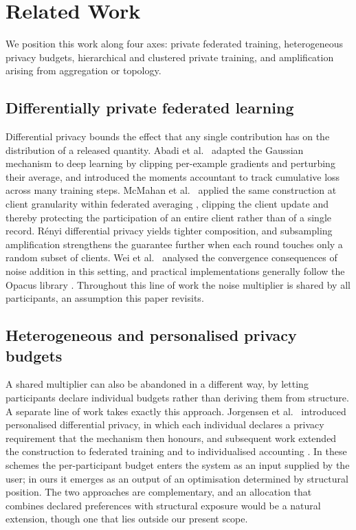 \documentclass[acmsmall,screen,review,anonymous]{acmart}
\theoremstyle{acmdefinition}%
\begin{document}
\section{Related Work}
\label{sec:related}

We position this work along four axes: private federated training, heterogeneous
privacy budgets, hierarchical and clustered private training, and amplification
arising from aggregation or topology.

\subsection{Differentially private federated learning}

Differential privacy \cite{dwork2006calibrating} bounds the effect that any single
contribution has on the distribution of a released quantity. Abadi et
al.~\cite{abadi2016dpsgd} adapted the Gaussian mechanism to deep learning by
clipping per-example gradients and perturbing their average, and introduced the
moments accountant to track cumulative loss across many training steps. McMahan et
al.~\cite{mcmahan2018dprnn} applied the same construction at client granularity
within federated averaging \cite{mcmahan2017fedavg}, clipping the client update and
thereby protecting the participation of an entire client rather than of a single
record. R\'enyi differential privacy \cite{mironov2017rdp} yields tighter
composition, and subsampling amplification \cite{wang2019subsampled} strengthens
the guarantee further when each round touches only a random subset of clients. Wei
et al.~\cite{wei2020nbafl} analysed the convergence consequences of noise addition
in this setting, and practical implementations generally follow the Opacus library
\cite{yousefpour2021opacus}. Throughout this line of work the noise multiplier is
shared by all participants, an assumption this paper revisits.

\subsection{Heterogeneous and personalised privacy budgets}

A shared multiplier can also be abandoned in a different way, by letting
participants declare individual budgets rather than deriving them from structure. A
separate line of work takes exactly this approach. Jorgensen et
al.~\cite{jorgensen2015personalized} introduced personalised differential privacy,
in which each individual declares a privacy requirement that the mechanism then
honours, and subsequent work extended the construction to federated training and to
individualised accounting \cite{boenisch2023individualized}. In these schemes the
per-participant budget enters the system as an input supplied by the user; in ours
it emerges as an output of an optimisation determined by structural position. The
two approaches are complementary, and an allocation that combines declared
preferences with structural exposure would be a natural extension, though one that
lies outside our present scope.
\end{document}
